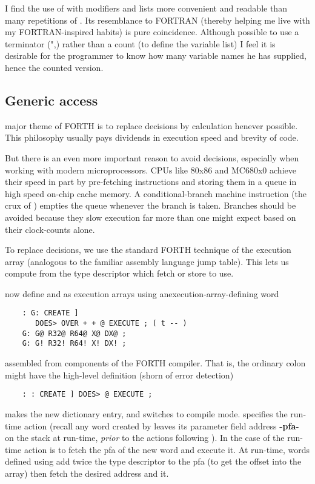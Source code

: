 I find the use of  with modifiers and lists more convenient and readable than many repetitions of . Its resemblance to FORTRAN (thereby helping me live with my FORTRAN-inspired habits) is pure coincidence. Although possible to use a terminator (",\eg) rather than a count (to define the variable list) I feel it is desirable for the programmer to know how many variable names he has supplied, hence the counted version.

\subsection{Generic access}
 major theme of FORTH is to replace decisions by calculation henever possible. This philosophy usually pays dividends in execution speed and brevity of code.

But there is an even more important reason to avoid  decisions, especially when working with modern microprocessors. CPUs like 80x86 and MC680x0 achieve their speed in part by pre-fetching instructions and storing them in a queue in high speed on-chip cache memory. A conditional-branch machine instruction (the crux of ) empties the queue whenever the branch is taken. Branches should be avoided because they slow execution far more than one might expect based on their clock-counts alone.

To replace decisions, we use the standard FORTH technique of the execution array (analogous to the familiar assembly language jump table). This lets us compute from the type descriptor which fetch or store to use.

 now define  and  as execution arrays using anexecution-array-defining word 

\begin{lstlisting}
    : G: CREATE ]
       DOES> OVER + + @ EXECUTE ; ( t -- )
    G: G@ R32@ R64@ X@ DX@ ;
    G: G! R32! R64! X! DX! ;
\end{lstlisting}

assembled from components of the FORTH compiler. That is, the ordinary colon \bc{:} might have the high-level definition (shorn of error detection)

\begin{lstlisting}
    : : CREATE ] DOES> @ EXECUTE ;
\end{lstlisting}

 makes the new dictionary entry, and \bc{]} switches to
compile mode.  specifies the run-time action (recall any word created by  leaves its parameter field address
\textbf{-pfa-} on the stack at run-time, \textit{prior} to the actions following ). In the case of \bc{:} the run-time action is to fetch the pfa of the new word and execute it. At run-time, words defined using  add twice the type descriptor to the pfa (to get the offset into the array) then fetch the desired address and  it.

